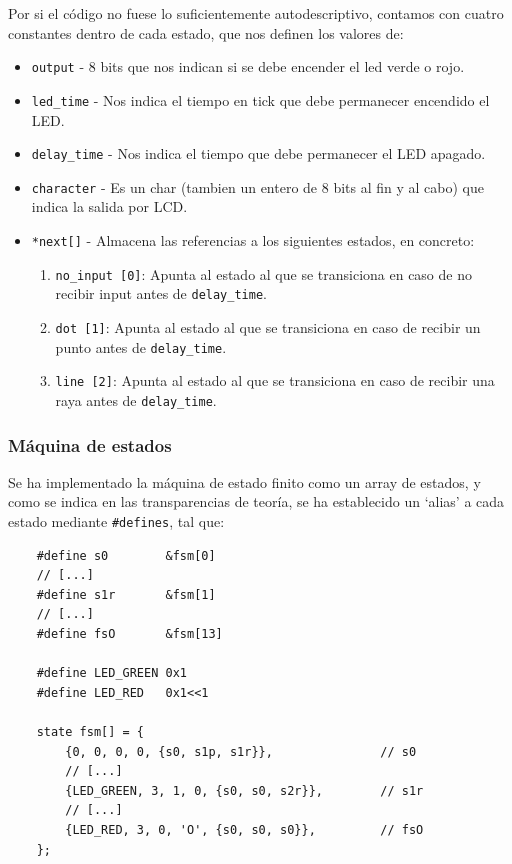 \documentclass[a4paper,openright,12pt]{article}
\begin{document}
Por si el código no fuese lo suficientemente autodescriptivo, contamos con cuatro constantes dentro de cada estado, que nos definen los valores de:
\begin{itemize}
    \item \texttt{output} - 8 bits que nos indican si se debe encender el led verde o rojo.
    \item \texttt{led\_time} - Nos indica el tiempo en tick que debe permanecer encendido el LED.
    \item \texttt{delay\_time} - Nos indica el tiempo que debe permanecer el LED apagado.
    \item \texttt{character} - Es un char (tambien un entero de 8 bits al fin y al cabo) que indica la salida por LCD.
    \item \texttt{*next[]} - Almacena las referencias a los siguientes estados, en concreto: \begin{enumerate}
        \item \texttt{no\_input [0]}: Apunta al estado al que se transiciona en caso de no recibir input antes de \texttt{delay\_time}.
        \item \texttt{dot [1]}: Apunta al estado al que se transiciona en caso de recibir un punto antes de \texttt{delay\_time}.
        \item \texttt{line [2]}: Apunta al estado al que se transiciona en caso de recibir una raya antes de \texttt{delay\_time}.
    \end{enumerate}
\end{itemize}


\subsubsection{Máquina de estados}
Se ha implementado la máquina de estado finito como un array de estados, y como se indica en las transparencias de teoría, se ha establecido un `alias' a cada estado
mediante \texttt{\#defines}, tal que:
\begin{samepage}    
\begin{verbatim}
    #define s0        &fsm[0]
    // [...]
    #define s1r       &fsm[1]
    // [...]
    #define fsO       &fsm[13]

    #define LED_GREEN 0x1
    #define LED_RED   0x1<<1

    state fsm[] = {
        {0, 0, 0, 0, {s0, s1p, s1r}},               // s0
        // [...]
        {LED_GREEN, 3, 1, 0, {s0, s0, s2r}},        // s1r
        // [...]
        {LED_RED, 3, 0, 'O', {s0, s0, s0}},         // fsO
    };
\end{verbatim}
\end{samepage}
\end{document}
